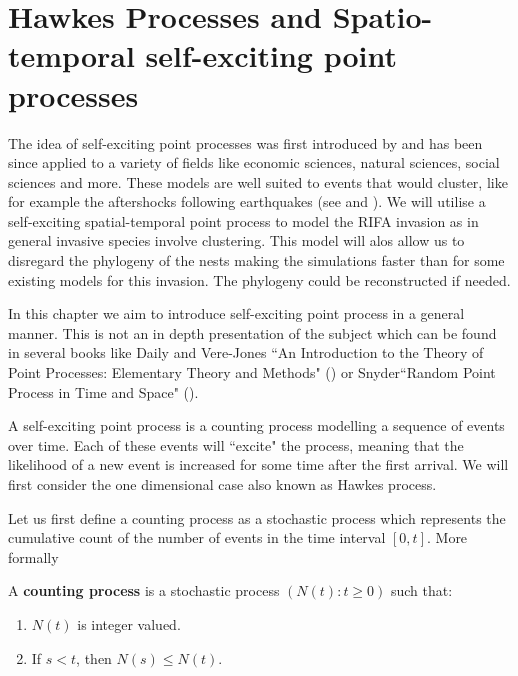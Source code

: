 \chapter[Hawkes Processes and Spatio-temporal self-exciting point processes]{Hawkes Processes and Spatio-temporal self-exciting point processes}
\label{ch:Hawkes}

The idea of self-exciting point processes was first introduced by \cite{Hawkes71} and has been since applied to a variety of fields like economic sciences, natural sciences, social sciences and more. These models are well suited to events that would cluster, like for example the aftershocks following earthquakes (see \cite{Ogata88} and \cite{Mohler}). We will utilise a self-exciting spatial-temporal point process to model the RIFA invasion as in general invasive species involve clustering. This model will alos allow us to disregard the phylogeny of the nests making the simulations faster than for some existing models for this invasion. The phylogeny could be reconstructed if needed.

In this chapter we aim to introduce self-exciting point process in a general manner. This is not an in depth presentation of the subject which can be found in several books like Daily and Vere-Jones ``An Introduction to the Theory of Point Processes: Elementary Theory and Methods" (\cite{Daley}) or Snyder``Random Point Process in Time and Space" (\cite{Snyder}).

A self-exciting point process is a counting process modelling a sequence of events over time. Each of these events will ``excite" the process, meaning that the likelihood of a new event is increased for some time after the first arrival. We will first consider the one dimensional case also known as Hawkes process.

Let us first define a counting process as a stochastic process which represents the cumulative count of the number of events in the time interval $[0, t]$. More formally

\begin{definition}
    A \textbf{counting process} is a stochastic process $(N(t) : t \geq 0)$ such that:
    \begin{enumerate}[label=(\roman*)]
        \item $N(t)$ is integer valued.
        \item If $s<t$, then $N(s) \leq N(t)$.
    \end{enumerate}
\end{definition}


